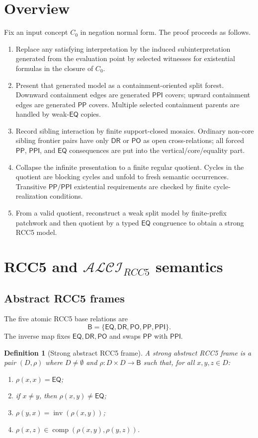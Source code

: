 \documentclass[11pt]{article}
\newtheorem{definition}{Definition}[section]
\theoremstyle{remark}
\newcommand{\Base}{\mathsf{B}}
\newcommand{\DR}{\mathsf{DR}}
\newcommand{\PO}{\mathsf{PO}}
\newcommand{\PP}{\mathsf{PP}}
\newcommand{\PPI}{\mathsf{PPI}}
\newcommand{\EQ}{\mathsf{EQ}}
\newcommand{\Inv}{\operatorname{inv}}
\newcommand{\comp}{\operatorname{comp}}
\begin{document}
\section{Overview}
Fix an input concept $C_0$ in negation normal form.  The proof proceeds as follows.
\begin{enumerate}
\item Replace any satisfying interpretation by the induced subinterpretation generated from the evaluation point by selected witnesses for existential formulas in the closure of $C_0$.
\item Present that generated model as a containment-oriented split forest.  Downward containment edges are generated $\PPI$ covers; upward containment edges are generated $\PP$ covers.  Multiple selected containment parents are handled by weak-$\EQ$ copies.
\item Record sibling interaction by finite support-closed mosaics.  Ordinary non-core sibling frontier pairs have only $\DR$ or $\PO$ as open cross-relations; all forced $\PP$, $\PPI$, and $\EQ$ consequences are put into the vertical/core/equality part.
\item Collapse the infinite presentation to a finite regular quotient.  Cycles in the quotient are blocking cycles and unfold to fresh semantic occurrences.  Transitive $\PP/\PPI$ existential requirements are checked by finite cycle-realization conditions.
\item From a valid quotient, reconstruct a weak split model by finite-prefix patchwork and then quotient by a typed $\EQ$ congruence to obtain a strong RCC5 model.
\end{enumerate}

\section{RCC5 and $\mathcal{ALCI}_{RCC5}$ semantics}
\subsection{Abstract RCC5 frames}
The five atomic RCC5 base relations are
\[
\Base=\{\EQ,\DR,\PO,\PP,\PPI\}.
\]
The inverse map fixes $\EQ,\DR,\PO$ and swaps $\PP$ with $\PPI$.

\begin{definition}[Strong abstract RCC5 frame]
A strong abstract RCC5 frame is a pair $(D,\rho)$ where $D\ne\emptyset$ and $\rho:D\times D\to\Base$ such that, for all $x,y,z\in D$:
\begin{enumerate}
\item $\rho(x,x)=\EQ$;
\item if $x\ne y$, then $\rho(x,y)\ne\EQ$;
\item $\rho(y,x)=\Inv(\rho(x,y))$;
\item $\rho(x,z)\in\comp(\rho(x,y),\rho(y,z))$.
\end{enumerate}
\end{definition}
\end{document}
